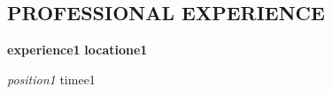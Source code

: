 \begin{{document}}

\section{{PROFESSIONAL EXPERIENCE}}

\textbf{{experience1}} \hfill \textbf{{locatione1}}

\begin{{itemize}}

\item \textit{{position1}} \hfill {{timee1}}

\end{{itemize}}

\end{{document}}

